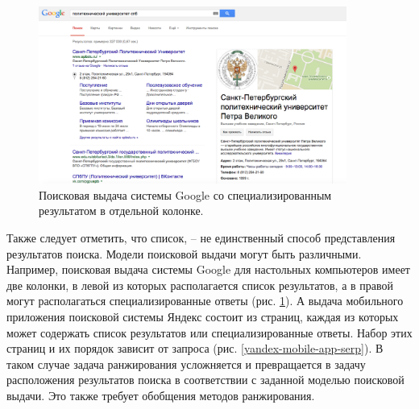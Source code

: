 \documentclass[12pt,a4paper]{report}
\newcommand\figref[1]{(рис. \ref{#1})}
\begin{document}
\begin{figure}[b!]
  \centering
  \includegraphics[width=0.9\textwidth]{pics/EntitySearch-Google.png}
  \caption{Поисковая выдача системы Google со специализированным результатом в отдельной колонке.}
  \label{two-coloumn-serp}
\end{figure}

Также следует отметить, что список, -- не единственный способ представления результатов поиска. Модели поисковой выдачи могут быть различными. Например, поисковая выдача системы Google для настольных компьютеров имеет две колонки, в левой из которых располагается список результатов, а в правой могут располагаться специализированные ответы \figref{two-coloumn-serp}. А выдача мобильного приложения поисковой системы Яндекс состоит из страниц, каждая из которых может содержать список результатов или специализированные ответы. Набор этих страниц и их порядок зависит от запроса \figref{yandex-mobile-app-serp}. В таком случае задача ранжирования усложняется и превращается в задачу расположения результатов поиска в соответствии с заданной моделью поисковой выдачи. Это также требует обобщения методов ранжирования.
\end{document}
